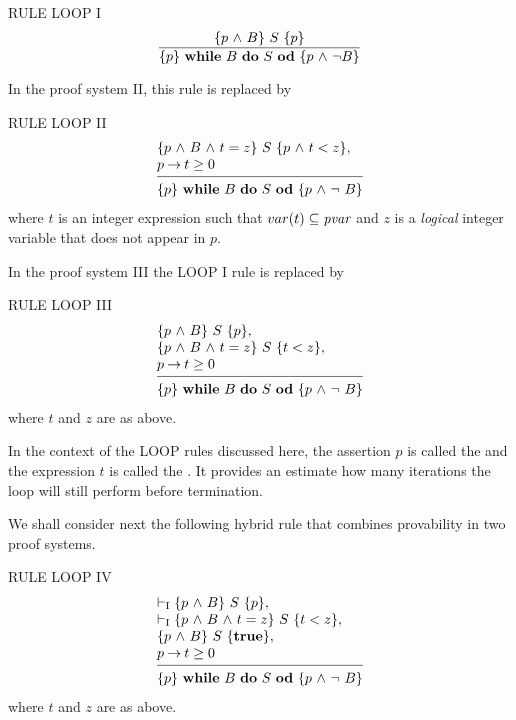 \documentclass[manuscript, screen, review]{acmart}
\begin{document}
\NI
RULE LOOP I
\[ 
 \frac{ \mbox{$\{{p \mbox{$\ \wedge\ $} B}\}\ {S}\ \{{p}\}$}                }
      { \mbox{$\{{p}\}\ {\mbox{$\mbox{{\bf while}\ } {B}\ \mbox{{\bf do}\ } {S}\ \mbox{{\bf od}}$}}\ \{{p \mbox{$\ \wedge\ $} \neg B}\}$}  }
\]
\III


In the proof system II, this rule  is replaced by
\III

\NI
RULE LOOP II
\[
 \begin{array}{l}
  \HT{p \A B \A t=z}{S}{p \A t<z},          \\
  p \ra t \geq 0                           \\
  [-\medskipamount]
  \hrulefill                                \\
  \HT{p}{\WDD{B}{S}}{p \A \neg\ B}
 \end{array}
\]
where $t$ is an integer expression such that  $var(t)\subseteq \mbox{\it pvar}$
and $z$ is a \emph{logical} integer variable that does not appear in $p$.


\III

In the proof system III the  LOOP I rule is replaced by
\III

\NI
RULE \label{rul:loop2} LOOP III
\[
 \begin{array}{l}
  \HT{p \A B}{S}{p},                      \\
  \HT{p \A B \A t=z}{S}{t<z},             \\
  p \ra t \geq 0                         \\
  [-\medskipamount]
  \hrulefill                              \\
  \HT{p}{\WDD{B}{S}}{p \A \neg\ B}
 \end{array}
\]
%
\NI
where $t$ and $z$ are as above.

\III

In the context of the LOOP rules discussed here, 
the assertion $p$ is called the  and the expression $t$
is called the . It provides an estimate how
many iterations the loop will still perform before termination.

We shall consider next the following hybrid rule that combines provability in two
proof systems.
\III

\NI
RULE LOOP IV
\[
 \begin{array}{l}
  \vdash_{\rm{I}}  \HT{p \A B}{S}{p},             \\
  \vdash_{\rm{I}}   \HT{p \A B \A t=z}{S}{t<z},   \\
  \HT{p \A B}{S}{\mathbf{true}},                  \\
  p \ra t \geq 0                                 \\
  [-\medskipamount]
  \hrulefill                                      \\
  \HT{p}{\WDD{B}{S}}{p \A \neg\ B}
 \end{array}
\]
%
\NI
where $t$ and $z$ are as above.
\III
\end{document}

